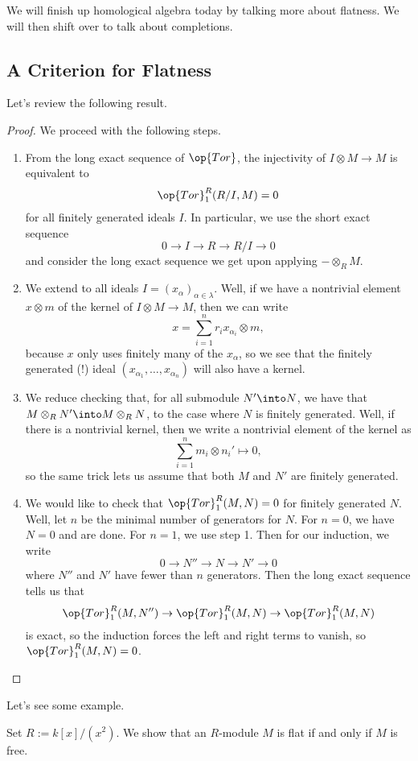 
We will finish up homological algebra today by talking more about flatness. We will then shift over to talk about completions.

\subsection{A Criterion for Flatness}
Let's review the following result.
\flatcondition*
\begin{proof}
	We proceed with the following steps.
	\begin{enumerate}
		\item From the long exact sequence of $\op{Tor}$, the injectivity of $I\otimes M\to M$ is equivalent to
		\[\op{Tor}_1^R(R/I,M)=0\]
		for all finitely generated ideals $I$. In particular, we use the short exact sequence
		\[0\to I\to R\to R/I\to 0\]
		and consider the long exact sequence we get upon applying $-\otimes_RM$.
		\item We extend to all ideals $I=(x_\alpha)_{\alpha\in\lambda}$. Well, if we have a nontrivial element $x\otimes m$ of the kernel of $I\otimes M\to M$, then we can write
		\[x=\sum_{i=1}^nr_ix_{\alpha_i}\otimes m,\]
		because $x$ only uses finitely many of the $x_\alpha$, so we see that the finitely generated (!) ideal $(x_{\alpha_1},\ldots,x_{\alpha_n})$ will also have a kernel.
		\item We reduce checking that, for all submodule $N'\into N$, we have that $M\otimes_RN'\into M\otimes_RN$, to the case where $N$ is finitely generated. Well, if there is a nontrivial kernel, then we write a nontrivial element of the kernel as
		\[\sum_{i=1}^nm_i\otimes n_i'\mapsto0,\]
		so the same trick lets us assume that both $M$ and $N'$ are finitely generated.

		\item We would like to check that $\op{Tor}_1^R(M,N)=0$ for finitely generated $N$. Well, let $n$ be the minimal number of generators for $N$. For $n=0$, we have $N=0$ and are done. For $n=1$, we use step 1. Then for our induction, we write
		\[0\to N''\to N\to N'\to0\]
		where $N''$ and $N'$ have fewer than $n$ generators. Then the long exact sequence tells us that
		\[\op{Tor}_1^R(M,N'')\to\op{Tor}_1^R(M,N)\to\op{Tor}_1^R(M,N)\]
		is exact, so the induction forces the left and right terms to vanish, so $\op{Tor}_1^R(M,N)=0$.
		\qedhere
	\end{enumerate}
\end{proof}
Let's see some example.
\begin{exe}
	Set $R:=k[x]/\left(x^2\right)$. We show that an $R$-module $M$ is flat if and only if $M$ is free.
\end{exe}
